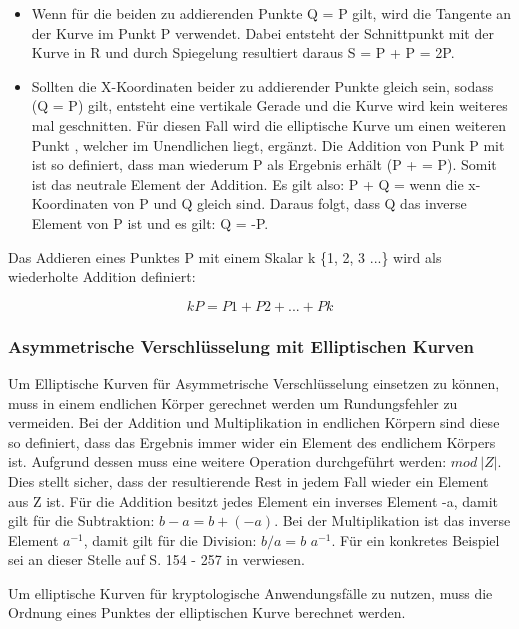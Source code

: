 		\begin{itemize}
			\item Wenn für die beiden zu addierenden Punkte Q = P gilt, wird die Tangente an der Kurve im Punkt P verwendet. Dabei entsteht der Schnittpunkt mit der Kurve in R und durch Spiegelung resultiert daraus S = P + P = 2P.
			\item Sollten die X-Koordinaten beider zu addierender Punkte gleich sein, sodass (Q = P) gilt, entsteht eine vertikale Gerade und die Kurve wird kein weiteres mal geschnitten. Für diesen Fall wird die elliptische Kurve um einen weiteren Punkt \myInftyOhne, welcher im Unendlichen liegt, ergänzt. Die Addition von Punk P mit \myInfty ist so definiert, dass man wiederum P als Ergebnis erhält (P + \myInfty = P). Somit ist \myInfty das neutrale Element der Addition. Es gilt also: P + Q = \myInfty wenn die x-Koordinaten von P und Q gleich sind. Daraus folgt, dass Q das inverse Element von P ist und es gilt: Q = -P.
		\end{itemize}
		
		Das Addieren eines Punktes P mit einem Skalar k \myin \{1, 2, 3 ...\} wird als wiederholte Addition definiert:
		
		\begin{displaymath}
			kP = P1 + P2 + ... + Pk
		\end{displaymath}

		\subsubsection{Asymmetrische Verschlüsselung mit Elliptischen Kurven}
			Um Elliptische Kurven für Asymmetrische Verschlüsselung einsetzen zu können, muss in einem endlichen Körper gerechnet werden um Rundungsfehler zu vermeiden. Bei der Addition und Multiplikation in endlichen Körpern sind diese so definiert, dass das Ergebnis immer wider ein Element des endlichem Körpers ist. Aufgrund dessen muss eine weitere Operation durchgeführt werden: $mod~|Z|$. Dies stellt sicher, dass der resultierende Rest in jedem Fall wieder ein Element aus Z ist. Für die Addition besitzt jedes Element ein inverses Element -a, damit gilt für die Subtraktion: $b - a = b + (-a)$. Bei der Multiplikation ist das inverse Element $a^{-1}$, damit gilt für die Division: $b / a = b$ \mycdot $a^{-1}$. Für ein konkretes Beispiel sei an dieser Stelle auf S. 154 - 257 in \cite{Information:und:Kommunikation} verwiesen.
			
			Um elliptische Kurven für kryptologische Anwendungsfälle zu nutzen, muss die Ordnung eines Punktes der elliptischen Kurve berechnet werden.
			
